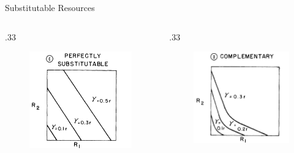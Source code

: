 \documentclass[final,xcolor=dvipsnames]{beamer}
\begin{document}
\begin{frame}{Substitutable Resources}
 \begin{columns}
  \begin{column}{.33\framewidth}
  \begin{figure}
       \includegraphics[width=.4\framewidth]{PerfectlySubst1}
    \end{figure}
  \end{column}
  \begin{column}{.33\framewidth}
    \begin{figure}
       \includegraphics[width=.4\framewidth]{Complementary1}

\end{figure}
\end{column}
\end{columns}
\end{frame}
\end{document}
